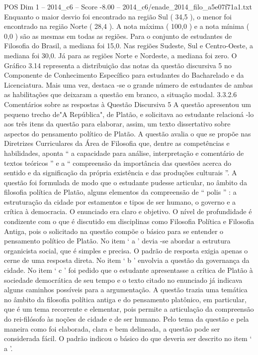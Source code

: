 \begin{textsample}{POS Dim 1 – 2014\_c6 – Score -8.00 – 2014\_c6/enade\_2014\_filo\_a5e07f71a1.txt}
Enquanto o maior desvio foi encontrado na região Sul ( 34,5 ), o menor foi encontrado na região Norte ( 28,4 ).
A nota máxima ( 100,0 ) e a nota mínima ( 0,0 ) são as mesmas em todas as regiões.
Para o conjunto de estudantes de Filosofia do Brasil, a mediana foi 15,0.
Nas regiões Sudeste, Sul e Centro-Oeste, a mediana foi 30,0.
Já para as regiões Norte e Nordeste, a mediana foi zero.
O Gráfico 3.14 representa a distribuição das notas da questão discursiva 5 no Componente de Conhecimento Específico para estudantes do Bacharelado e da Licenciatura.
Mais uma vez, destaca -se o grande número de estudantes de ambas as habilitações que deixaram a questão em branco, a situação modal. 3.3.2.6 Comentários sobre as respostas à Questão Discursiva 5 A questão apresentou um pequeno trecho de"A República", de Platão, e solicitava ao estudante relacioná -lo aos três itens da questão para elaborar, assim, um texto dissertativo sobre aspectos do pensamento político de Platão.
A questão avalia o que se propõe nas Diretrizes Curriculares da Área de Filosofia que, dentre as competências e habilidades, aponta “ a capacidade para análise, interpretação e comentário de textos teóricos ” e a “ compreensão da importância das questões acerca do sentido e da significação da própria existência e das produções culturais ”.
A questão foi formulada de modo que o estudante pudesse articular, no âmbito da filosofia política de Platão, alguns elementos da compreensão de “ polis ” : a estruturação da cidade por estamentos e tipos de ser humano, o governo e a crítica à democracia.
O enunciado era claro e objetivo.
O nível de profundidade é condizente com o que é discutido em disciplinas como Filosofia Política e Filosofia Antiga, pois o solicitado na questão compõe o básico para se entender o pensamento político de Platão.
No item ‘ a ’ devia -se abordar a estrutura organicista social, que é simples e precisa.
O padrão de resposta exigia apenas o cerne de uma resposta direta.
No item ‘ b ’ envolvia a questão da governança da cidade.
No item ‘ c ’ foi pedido que o estudante apresentasse a crítica de Platão à sociedade democrática de seu tempo e o texto citado no enunciado já indicava alguns caminhos possíveis para a argumentação.
A questão trazia uma temática no âmbito da filosofia política antiga e do pensamento platônico, em particular, que é um tema recorrente e elementar, pois permite a articulação da compreensão do rei-filósofo às noções de cidade e de ser humano.
Pelo tema da questão e pela maneira como foi elaborada, clara e bem delineada, a questão pode ser considerada fácil.
O padrão indicou o básico do que deveria ser descrito no item ‘ a ’.

\end{textsample}
